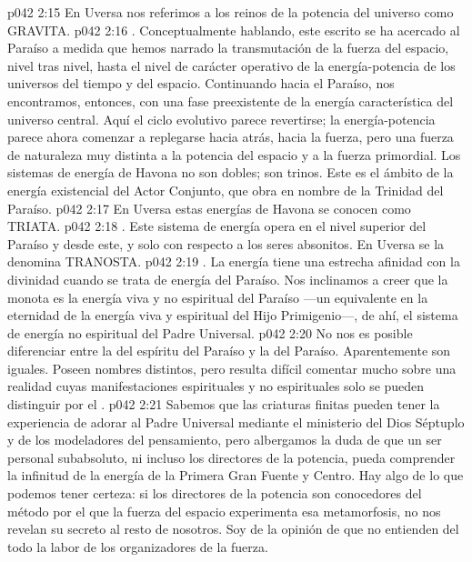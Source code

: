 \vs p042 2:15 En Uversa nos referimos a los reinos de la potencia del universo como GRAVITA.
\vs p042 2:16 . Conceptualmente hablando, este escrito se ha acercado al Paraíso a medida que hemos narrado la transmutación de la fuerza del espacio, nivel tras nivel, hasta el nivel de carácter operativo de la energía\hyp{}potencia de los universos del tiempo y del espacio. Continuando hacia el Paraíso, nos encontramos, entonces, con una fase preexistente de la energía característica del universo central. Aquí el ciclo evolutivo parece revertirse; la energía\hyp{}potencia parece ahora comenzar a replegarse hacia atrás, hacia la fuerza, pero una fuerza de naturaleza muy distinta a la potencia del espacio y a la fuerza primordial. Los sistemas de energía de Havona no son dobles; son trinos. Este es el ámbito de la energía existencial del Actor Conjunto, que obra en nombre de la Trinidad del Paraíso.
\vs p042 2:17 En Uversa estas energías de Havona se conocen como TRIATA.
\vs p042 2:18 . Este sistema de energía opera en el nivel superior del Paraíso y desde este, y solo con respecto a los seres absonitos. En Uversa se la denomina TRANOSTA.
\vs p042 2:19 . La energía tiene una estrecha afinidad con la divinidad cuando se trata de energía del Paraíso. Nos inclinamos a creer que la monota es la energía viva y no espiritual del Paraíso ---un equivalente en la eternidad de la energía viva y espiritual del Hijo Primigenio---, de ahí, el sistema de energía no espiritual del Padre Universal.
\vs p042 2:20 No nos es posible diferenciar entre la  del espíritu del Paraíso y la  del Paraíso. Aparentemente son iguales. Poseen nombres distintos, pero resulta difícil comentar mucho sobre una realidad cuyas manifestaciones espirituales y no espirituales solo se pueden distinguir por el .
\vs p042 2:21 \pc Sabemos que las criaturas finitas pueden tener la experiencia de adorar al Padre Universal mediante el ministerio del Dios Séptuplo y de los modeladores del pensamiento, pero albergamos la duda de que un ser personal subabsoluto, ni incluso los directores de la potencia, pueda comprender la infinitud de la energía de la Primera Gran Fuente y Centro. Hay algo de lo que podemos tener certeza: si los directores de la potencia son conocedores del método por el que la fuerza del espacio experimenta esa metamorfosis, no nos revelan su secreto al resto de nosotros. Soy de la opinión de que no entienden del todo la labor de los organizadores de la fuerza.
